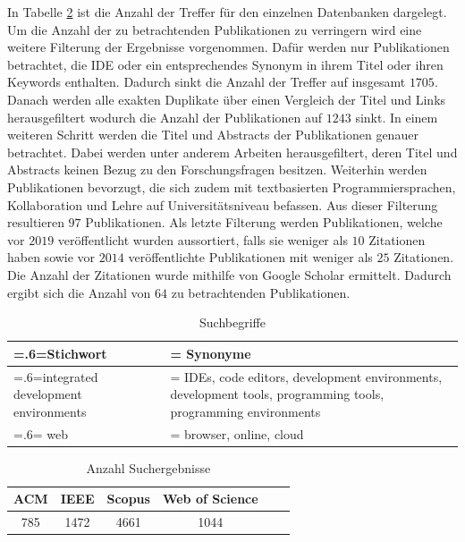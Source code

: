 In Tabelle \ref{table:amount-search-results} ist die Anzahl der Treffer für den einzelnen Datenbanken dargelegt. Um die Anzahl der zu betrachtenden Publikationen zu verringern wird eine weitere Filterung der Ergebnisse vorgenommen. Dafür werden nur Publikationen betrachtet, die IDE oder ein entsprechendes Synonym in ihrem Titel oder ihren Keywords enthalten. Dadurch sinkt die Anzahl der Treffer auf insgesamt $1705$. Danach werden alle exakten Duplikate über einen Vergleich der Titel und Links herausgefiltert wodurch die Anzahl der Publikationen auf $1243$ sinkt. In einem weiteren Schritt werden die Titel und Abstracts der Publikationen genauer betrachtet. Dabei werden unter anderem Arbeiten herausgefiltert, deren Titel und Abstracts keinen Bezug zu den Forschungsfragen besitzen. Weiterhin werden Publikationen bevorzugt, die sich zudem mit textbasierten Programmiersprachen, Kollaboration und Lehre auf Universitätsniveau befassen. Aus dieser Filterung resultieren $97$ Publikationen. Als letzte Filterung werden Publikationen, welche vor $2019$ veröffentlicht wurden aussortiert, falls sie weniger als $10$ Zitationen haben sowie vor $2014$ veröffentlichte Publikationen mit weniger als $25$ Zitationen. Die Anzahl der Zitationen wurde mithilfe von Google Scholar ermittelt. Dadurch ergibt sich die Anzahl von $64$ zu betrachtenden Publikationen.

\begin{table}[tbp]
    \centering
    \begin{tabularx}{\textwidth}{| >{\hsize=.6\hsize\linewidth=\hsize}X |
            >{\hsize=1.4\hsize\linewidth=\hsize}X |}
        \hline
        Stichwort                           & Synonyme                                                                                                     \\
        \hline
        integrated development environments & IDEs, code editors, development environments, development tools, programming tools, programming environments \\
        \hline
        web                                 & browser, online, cloud                                                                                       \\
        \hline
    \end{tabularx}
    \caption{Suchbegriffe}
    \label{table:search-terms}
\end{table}

\begin{table}[tbp]
    \centering
    \begin{tabular}{|c|c|c|c|c|c|}
        \hline
        ACM & IEEE & Scopus & Web of Science \\
        \hline
        785 & 1472 & 4661   & 1044           \\
        \hline
    \end{tabular}
    \caption{Anzahl Suchergebnisse}
    \label{table:amount-search-results}
\end{table}

